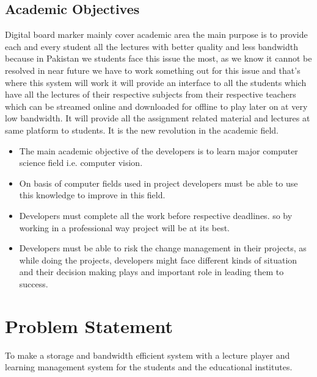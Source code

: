 \subsection{Academic Objectives}
Digital board marker mainly cover academic area the main purpose is to provide each and every student all the lectures with better quality and less bandwidth because in Pakistan we students face this issue the most, as we know it cannot be resolved in near future we have to work something out for this issue and that's where this system will work it will provide an interface to all the students which have all the lectures of their respective subjects from their respective teachers which can be streamed online and downloaded for offline to play later on at very low bandwidth. It will provide all the assignment related material and lectures at same platform to students. It is the new revolution in the academic field.

\begin{itemize}

\item The main academic objective of the developers is to learn major computer science field i.e. computer vision.

\item On basis of computer fields used in project developers must be able to use this knowledge to improve in this field.

\item Developers must complete all the work before respective deadlines. so by working in a professional way project will be at its best.

\item Developers must be able to risk the change management in their projects, as while doing the projects, developers might face different kinds of situation and their decision making plays and important role in leading them to success.

\end{itemize}
\bigskip

\section{Problem Statement}
To make a storage and bandwidth efficient system with a lecture player and learning management system for the students and the educational institutes.
\bigskip

